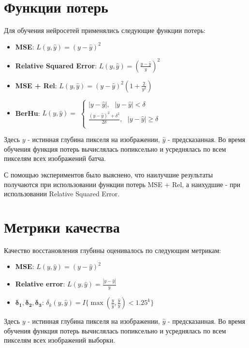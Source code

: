 \documentclass{mipt-thesis-bs}
\begin{document}
\section{Функции потерь}

Для обучения нейросетей применялись следующие функции потерь:
\begin{itemize}
	\item \textbf{MSE}: $ L(y, \widehat{y}) = (y - \widehat{y})^2 $
	\item \textbf{Relative Squared Error}: $  L(y, \widehat{y}) = (\frac{y - \widehat{y}}{y})^2 $
	\item \textbf{MSE + Rel}: $ L(y, \widehat{y}) = (y - \widehat{y})^2 (1 + \frac{2}{y^2}) $
	\item \textbf{BerHu}: $ L(y, \widehat{y}) =$ 
	$\begin{cases}
	|y - \widehat{y}|, \text{\ \ \ \ \ } |y - \widehat{y}| < \delta\\
	\frac{(y - \widehat{y})^2 + \delta^2}{2 \delta}, \text{\ } |y - \widehat{y}| \geq \delta\\
	\end{cases} $
\end{itemize}
Здесь $y$ - истинная глубина пикселя на изображении, $\widehat{y}$ - предсказанная. Во время обучения функция потерь вычислялась попиксельно и усреднялась по всем пикселям всех изображений батча.

С помощью экспериментов было выяснено, что наилучшие результаты получаются при использовании функции потерь MSE + Rel, а наихудшие - при использовании Relative Squared Error.

\section{Метрики качества}
\label{section_metrics}

Качество восстановления глубины оценивалось по следующим метрикам:
\begin{itemize}
	\item \textbf{MSE}: $ L(y, \widehat{y}) = (y - \widehat{y})^2 $
	
	\item \textbf{Relative error}: $  L(y, \widehat{y}) = \frac{|y - \widehat{y}|}{y} $
	
	\item $\boldsymbol{\delta_1, \delta_2, \delta_3}$: $\delta_k(y, \widehat{y}) = I\{\max(\frac{y}{\widehat{y}}, \frac{\widehat{y}}{y}) < 1.25^k\}$
\end{itemize}
Здесь $y$ - истинная глубина пикселя на изображении, $\widehat{y}$ - предсказанная. Во время обучения функция потерь вычислялась попиксельно и усреднялась по всем пикселям всех изображений выборки.
\end{document}
